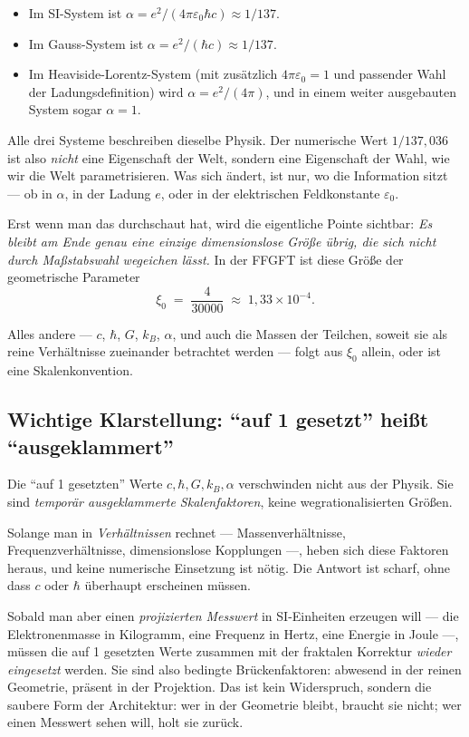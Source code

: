\begin{itemize}\setlength\itemsep{0pt}
  \item Im SI-System ist $\alpha = e^{2}/(4\pi\varepsilon_{0}\hbar c) \approx 1/137$.
  \item Im Gauss-System ist $\alpha = e^{2}/(\hbar c) \approx 1/137$.
  \item Im Heaviside-Lorentz-System (mit zusätzlich $4\pi\varepsilon_{0} = 1$
        und passender Wahl der Ladungsdefinition) wird $\alpha = e^{2}/(4\pi)$,
        und in einem weiter ausgebauten System sogar $\alpha = 1$.
\end{itemize}

Alle drei Systeme beschreiben dieselbe Physik. Der numerische Wert
$1/137{,}036$ ist also \emph{nicht} eine Eigenschaft der Welt, sondern
eine Eigenschaft der Wahl, wie wir die Welt parametrisieren. Was sich
ändert, ist nur, wo die Information sitzt --- ob in $\alpha$, in der
Ladung $e$, oder in der elektrischen Feldkonstante $\varepsilon_{0}$.

Erst wenn man das durchschaut hat, wird die eigentliche Pointe sichtbar:
\emph{Es bleibt am Ende genau eine einzige dimensionslose Größe übrig, die
sich nicht durch Maßstabswahl wegeichen lässt.} In der FFGFT ist diese
Größe der geometrische Parameter
\[
  \xi_{0} \;=\; \frac{4}{30000} \;\approx\; 1{,}33 \times 10^{-4}.
\]

Alles andere --- $c$, $\hbar$, $G$, $k_B$, $\alpha$, und auch die Massen
der Teilchen, soweit sie als reine Verhältnisse zueinander betrachtet werden ---
folgt aus $\xi_{0}$ allein, oder ist eine Skalenkonvention.

\subsection*{Wichtige Klarstellung: ``auf 1 gesetzt'' heißt ``ausgeklammert''}

Die ``auf 1 gesetzten'' Werte $c, \hbar, G, k_B, \alpha$ verschwinden
nicht aus der Physik. Sie sind \emph{temporär ausgeklammerte
Skalenfaktoren}, keine wegrationalisierten Größen.

Solange man in \emph{Verhältnissen} rechnet --- Massenverhältnisse,
Frequenzverhältnisse, dimensionslose Kopplungen ---, heben sich diese
Faktoren heraus, und keine numerische Einsetzung ist nötig. Die Antwort
ist scharf, ohne dass $c$ oder $\hbar$ überhaupt erscheinen müssen.

Sobald man aber einen \emph{projizierten Messwert} in SI-Einheiten
erzeugen will --- die Elektronenmasse in Kilogramm, eine Frequenz in
Hertz, eine Energie in Joule ---, müssen die auf 1 gesetzten Werte
zusammen mit der fraktalen Korrektur \emph{wieder eingesetzt} werden.
Sie sind also bedingte Brückenfaktoren: abwesend in der reinen
Geometrie, präsent in der Projektion. Das ist kein Widerspruch, sondern
die saubere Form der Architektur: wer in der Geometrie bleibt, braucht
sie nicht; wer einen Messwert sehen will, holt sie zurück.

